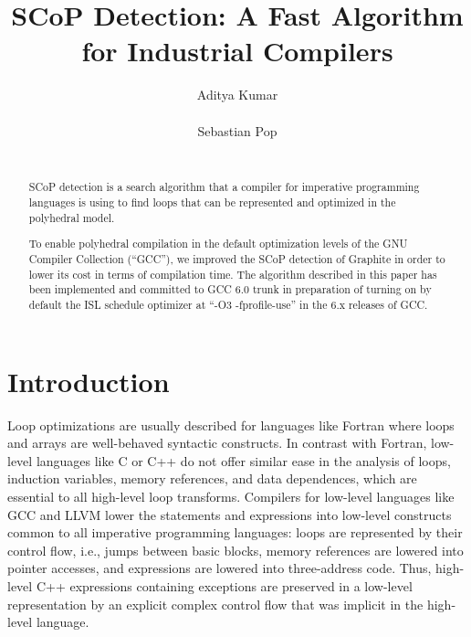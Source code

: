 \documentclass{sig-alternate}
\begin{document}
\setlength{\pdfpageheight}{\paperheight}
\setlength{\pdfpagewidth}{\paperwidth}

\title{SCoP Detection: A Fast Algorithm for Industrial Compilers}


\author{
\alignauthor
Aditya Kumar\\
       \\
\alignauthor
Sebastian Pop\\
       \\
}

\maketitle

\begin{abstract}
SCoP detection is a search algorithm that a compiler for imperative programming
languages is using to find loops that can be represented and optimized in the
polyhedral model.

To enable polyhedral compilation in the default optimization levels of the GNU
Compiler Collection (``GCC''), we improved the SCoP detection of Graphite in
order to lower its cost in terms of compilation time.  The algorithm described
in this paper has been implemented and committed to GCC 6.0 trunk in preparation
of turning on by default the ISL schedule optimizer at ``-O3 -fprofile-use'' in
the 6.x releases of GCC.
\end{abstract}

\section{Introduction}

Loop optimizations are usually described for languages like Fortran where loops
and arrays are well-behaved syntactic constructs.  In contrast with Fortran,
low-level languages like C or C++ do not offer similar ease in the analysis of
loops, induction variables, memory references, and data dependences, which are
essential to all high-level loop transforms.  Compilers for low-level languages
like GCC and LLVM lower the statements and expressions into low-level constructs
common to all imperative programming languages: loops are represented by their
control flow, i.e., jumps between basic blocks, memory references are lowered
into pointer accesses, and expressions are lowered into three-address code.
Thus, high-level C++ expressions containing exceptions are preserved in a
low-level representation by an explicit complex control flow that was implicit
in the high-level language.
\end{document}
